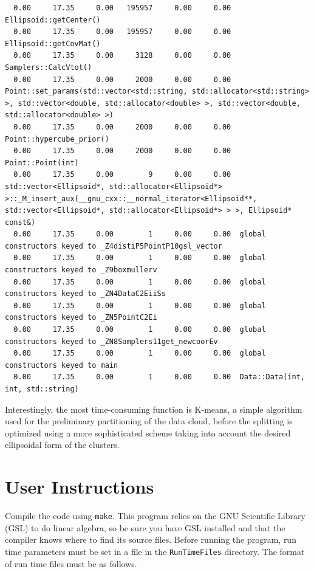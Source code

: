 \documentclass{article}
\begin{document}
\begin{verbatim}
  0.00     17.35     0.00   195957     0.00     0.00  Ellipsoid::getCenter()
  0.00     17.35     0.00   195957     0.00     0.00  Ellipsoid::getCovMat()
  0.00     17.35     0.00     3128     0.00     0.00  Samplers::CalcVtot()
  0.00     17.35     0.00     2000     0.00     0.00  Point::set_params(std::vector<std::string, std::allocator<std::string> >, std::vector<double, std::allocator<double> >, std::vector<double, std::allocator<double> >)
  0.00     17.35     0.00     2000     0.00     0.00  Point::hypercube_prior()
  0.00     17.35     0.00     2000     0.00     0.00  Point::Point(int)
  0.00     17.35     0.00        9     0.00     0.00  std::vector<Ellipsoid*, std::allocator<Ellipsoid*> >::_M_insert_aux(__gnu_cxx::__normal_iterator<Ellipsoid**, std::vector<Ellipsoid*, std::allocator<Ellipsoid*> > >, Ellipsoid* const&)
  0.00     17.35     0.00        1     0.00     0.00  global constructors keyed to _Z4distiP5PointP10gsl_vector
  0.00     17.35     0.00        1     0.00     0.00  global constructors keyed to _Z9boxmullerv
  0.00     17.35     0.00        1     0.00     0.00  global constructors keyed to _ZN4DataC2EiiSs
  0.00     17.35     0.00        1     0.00     0.00  global constructors keyed to _ZN5PointC2Ei
  0.00     17.35     0.00        1     0.00     0.00  global constructors keyed to _ZN8Samplers11get_newcoorEv
  0.00     17.35     0.00        1     0.00     0.00  global constructors keyed to main
  0.00     17.35     0.00        1     0.00     0.00  Data::Data(int, int, std::string)
\end{verbatim}
Interestingly, the most time-consuming function is K-means, a simple algorithm used for the preliminary partitioning of the data cloud, before the splitting is optimized using a more sophisticated scheme taking into account the desired ellipsoidal form of the clusters.
\section{User Instructions}
Compile the code using {\tt make}.  This program relies on the GNU Scientific Library (GSL) to do linear algebra, so be sure  you have GSL installed and that the compiler knows where to find its source files. Before running the program, run time parameters must be set in a file in the {\tt RunTimeFiles} directory. The format of run time files must be as follows. 
\end{document}
